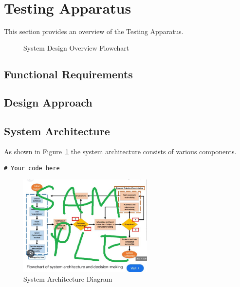 \section{Testing Apparatus}
This section provides an overview of the Testing Apparatus.

\begin{figure}[H]
    \centering
    \scalebox{0.8}{ %
        
    }
    \caption{System Design Overview Flowchart}
    \label{fig:decriptiveLabel11} %
\end{figure}

\subsection{Functional Requirements}

\subsection{Design Approach}

\subsection{System Architecture}
As shown in Figure~\ref{fig:decriptiveLabel11} the system architecture consists of various components.

\begin{lstlisting}[style=cstyle, caption=System Architecture Code Example, label=lst:SystemArchitecture7]
# Your code here
\end{lstlisting}

\begin{figure}[htbp] %
    \centering
    \includegraphics[width=0.6\textwidth]{figures/methodology/system_architecture.jpg}
    \caption{System Architecture Diagram}
    \label{fig:system-architecture2}
\end{figure}